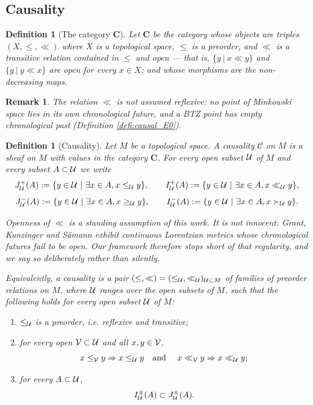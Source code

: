 \documentclass[a4paper,twoside]{article}
\newtheorem{defi}[lem]{Definition}
\newtheorem{rem}[lem]{Remark}
\def\tll{\ll}
\def\tlleq{\ll}
\begin{document}
	\subsection{Causality}
		\begin{defi}[The category $\mathbf{C}$]\label{defi:categorie_C}
			Let $\mathbf{C}$ be the category whose objects are triples $(X,\leq, \tlleq)$ where $X$ is a topological space, $\leq$ is a preorder, and $\tlleq$ is a transitive relation contained in $\leq$ and open --- that is, $\{y~|~x\tlleq y\}$ and $\{y~|~y \tlleq x\}$ are open for every $x\in X$; and whose morphisms are the non-decreasing maps.
		\end{defi}
		\begin{rem} The relation $\tlleq$ is \emph{not} assumed reflexive: no point of Minkowski space lies in its own chronological future, and a BTZ point has empty chronological past (Definition \ref{defi:causal_E0}).
		\end{rem}
		\begin{defi}[Causality]\label{defi:causalite}
			Let $M$ be a topological space. A causality $\mathscr{C}$ on $M$ is a sheaf on $M$ with values in the category $\mathbf{C}$.
			For every open subset $\mathcal{U}$ of $M$ and every subset $A\subset \mathcal{U}$ we write
			$$J^+_\U(A) := \{y\in \U ~|~ \exists x\in A, x\leq_\U y\}, \quad \quad I^+_\U(A):=\{y\in \U ~|~\exists x\in A, x\tll_\U y\}, $$
			$$J^-_{\mathcal{U}}(A) := \{y\in \mathcal{U} ~|~ \exists x\in A, x\geq_{\mathcal{U}} y\}, \quad \quad I^-_{\mathcal{U}}(A):=\{y\in \mathcal{U} ~|~\exists x\in A, x\succ_{\mathcal{U}} y\}.$$

			Openness of $\ll$ is a standing assumption of this work. It is not innocent: Grant, Kunzinger and S\"amann \cite{MR4047145} exhibit continuous Lorentzian metrics whose chronological futures fail to be open. Our framework therefore stops short of that regularity, and we say so deliberately rather than silently.

			Equivalently, a causality is a pair $(\leq,\tll )=(\leq_{\U},\ll_\U)_{\U\subset M}$ of families of preorder relations on $M$, where $\mathcal{U}$ ranges over the open subsets of $M$, such that the following holds for every open subset $\mathcal{U}$ of $M$:
			\begin{enumerate}[label=(\alph*)]
				\item $\leq_{\mathcal{U}}$ is a preorder, i.e. reflexive and transitive;
				\item for every open $\mathcal V\subset \mathcal{U}$ and all $x,y\in \mathcal V$,
					$$x\leq_{\mathcal V}y \Rightarrow  x\leq_{\mathcal{U}}y \quad \text{and }\quad x\ll_{\mathcal V}y\Rightarrow  x\ll_{\mathcal{U}}y;$$
				\item for every $A\subset \mathcal{U}$, $$I_{\mathcal{U}}^\pm(A)\subset J_{\mathcal{U}}^\pm(A).$$
			\end{enumerate}
		\end{defi}
\end{document}
